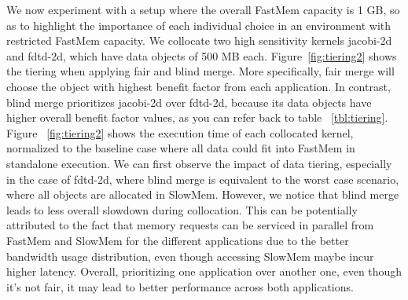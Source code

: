 \noindent We now experiment with a setup where the overall FastMem capacity is 1 GB, so as to highlight the importance of each individual choice in an environment with restricted FastMem capacity. We collocate 
two high sensitivity kernels jacobi-2d and fdtd-2d, which have data objects of 500 MB each. Figure~\ref{fig:tiering2} shows the tiering when applying fair and blind merge. 
More specifically, fair merge will choose the object with highest benefit factor from each application. In contrast, blind merge prioritizes jacobi-2d over fdtd-2d, because its data objects have 
higher overall benefit factor values, as you can refer back to table ~\ref{tbl:tiering}. Figure ~\ref{fig:tiering2} shows the execution time of each collocated kernel, normalized to the baseline case where all data could fit into FastMem in 
standalone execution. 
We can first observe the impact of data tiering, especially in the case of fdtd-2d, where blind merge is equivalent to the worst case scenario, where all objects are allocated in SlowMem. 
However, we notice that blind merge leads to less overall slowdown during collocation. This can be potentially attributed to the fact that memory requests can be serviced in parallel from FastMem and SlowMem for the different applications due to the better bandwidth usage distribution, even 
though accessing SlowMem maybe incur higher latency. Overall, prioritizing one application over another one, even though it's not fair, it may lead to better performance across both applications. 

